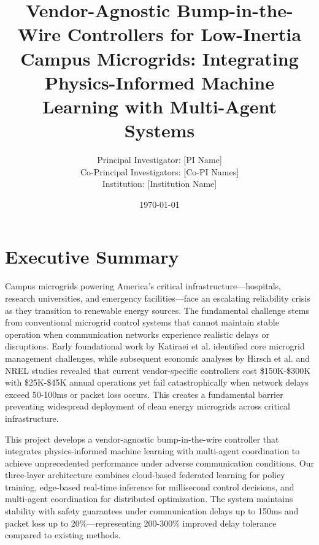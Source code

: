 \documentclass[12pt]{article}
\begin{document}
\title{\Large\textbf{Vendor-Agnostic Bump-in-the-Wire Controllers for Low-Inertia Campus Microgrids: Integrating Physics-Informed Machine Learning with Multi-Agent Systems}}


\author{Principal Investigator: [PI Name]\\
Co-Principal Investigators: [Co-PI Names]\\
Institution: [Institution Name]}

\date{\today}

\maketitle

\section{Executive Summary}

Campus microgrids powering America's critical infrastructure---hospitals, research universities, and emergency facilities---face an escalating reliability crisis as they transition to renewable energy sources. The fundamental challenge stems from conventional microgrid control systems that cannot maintain stable operation when communication networks experience realistic delays or disruptions. Early foundational work by Katiraei et al. \cite{katiraei2008} identified core microgrid management challenges, while subsequent economic analyses by Hirsch et al. \cite{hirsch2018} and NREL studies \cite{sigrin2019} revealed that current vendor-specific controllers cost \$150K-\$300K with \$25K-\$45K annual operations yet fail catastrophically when network delays exceed 50-100ms or packet loss occurs. This creates a fundamental barrier preventing widespread deployment of clean energy microgrids across critical infrastructure.

This project develops a vendor-agnostic bump-in-the-wire controller that integrates physics-informed machine learning with multi-agent coordination to achieve unprecedented performance under adverse communication conditions. Our three-layer architecture combines cloud-based federated learning for policy training, edge-based real-time inference for millisecond control decisions, and multi-agent coordination for distributed optimization. The system maintains stability with safety guarantees under communication delays up to 150ms and packet loss up to 20\%—representing 200-300\% improved delay tolerance compared to existing methods.
\end{document}
